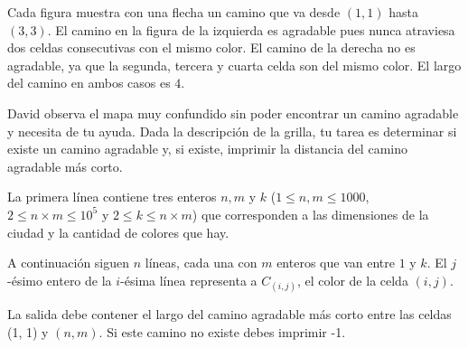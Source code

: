 \documentclass{oci}
\begin{document}
\begin{problemDescription}
\begin{figure}[!h]
\end{figure}

Cada figura muestra con una flecha un camino que va desde $(1,1)$ hasta $(3,3)$.
%
El camino en la figura de la izquierda es agradable pues nunca atraviesa dos celdas
consecutivas con el mismo color.
%
El camino de la derecha no es agradable, ya que la segunda, tercera y cuarta
celda son del mismo color.
%
El largo del camino en ambos casos es $4$.

David observa el mapa muy confundido sin poder encontrar un camino agradable y necesita de tu
ayuda.
%
Dada la descripción de la grilla, tu tarea es determinar si existe un camino agradable
y, si existe, imprimir la distancia del camino agradable más corto.

\end{problemDescription}


\begin{inputDescription}
La primera línea contiene tres enteros $n, m$ y $k$
($1 \leq n, m \leq 1000$, $2 \leq n\times m \leq 10^5$ y $2 \leq k \leq n \times m$)
que corresponden a las dimensiones de la ciudad y la cantidad de colores que hay.

A continuación siguen $n$ líneas, cada una con $m$ enteros que van entre $1$ y $k$.
%
El $j$-ésimo entero de la $i$-ésima línea representa a $C_{(i,j)}$, el color de la celda $(i,j)$.

\end{inputDescription}

\begin{outputDescription}
  La salida debe contener el largo del camino agradable más corto
  entre las celdas (1, 1) y $(n, m)$.
  Si este camino no existe debes imprimir -1.

\end{outputDescription}
\end{document}
